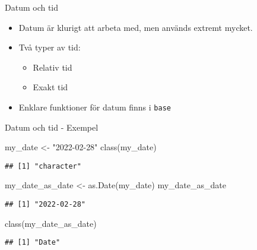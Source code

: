 \documentclass[
  11pt,
  ignorenonframetext,
  handout]{beamer}
\newenvironment{Shaded}{\begin{snugshade}}{\end{snugshade}}
\newcommand{\FunctionTok}[1]{\textcolor[rgb]{0.00,0.00,0.00}{#1}}
\newcommand{\NormalTok}[1]{#1}
\newcommand{\OtherTok}[1]{\textcolor[rgb]{0.56,0.35,0.01}{#1}}
\newcommand{\StringTok}[1]{\textcolor[rgb]{0.31,0.60,0.02}{#1}}
\providecommand{\tightlist}{%
  \setlength{\itemsep}{0pt}\setlength{\parskip}{0pt}}
\begin{document}
\begin{frame}{Datum och tid}
\protect\hypertarget{datum-och-tid-1}{}
\begin{itemize}
\tightlist
\item
  Datum är klurigt att arbeta med, men används extremt mycket.
\item
  Två typer av tid:

  \begin{itemize}
  \tightlist
  \item
    Relativ tid
  \item
    Exakt tid
  \end{itemize}
\item
  Enklare funktioner för datum finns i \texttt{base}
\end{itemize}
\end{frame}

\begin{frame}[fragile]{Datum och tid - Exempel}
\protect\hypertarget{datum-och-tid---exempel}{}
\begin{Shaded}
\begin{Highlighting}[]
\NormalTok{my\_date }\OtherTok{\textless{}{-}} \StringTok{"2022{-}02{-}28"}
\FunctionTok{class}\NormalTok{(my\_date)}
\end{Highlighting}
\end{Shaded}

\begin{verbatim}
## [1] "character"
\end{verbatim}

\begin{Shaded}
\begin{Highlighting}[]
\NormalTok{my\_date\_as\_date }\OtherTok{\textless{}{-}} \FunctionTok{as.Date}\NormalTok{(my\_date)}
\NormalTok{my\_date\_as\_date}
\end{Highlighting}
\end{Shaded}

\begin{verbatim}
## [1] "2022-02-28"
\end{verbatim}

\begin{Shaded}
\begin{Highlighting}[]
\FunctionTok{class}\NormalTok{(my\_date\_as\_date)}
\end{Highlighting}
\end{Shaded}

\begin{verbatim}
## [1] "Date"
\end{verbatim}
\end{frame}
\end{document}
